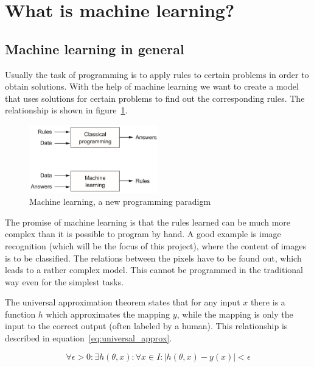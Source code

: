 \section{What is machine learning?} \label{ch:what_is_ml}

\subsection{Machine learning in general}

Usually the task of programming is to apply rules to certain problems in order to obtain solutions.
With the help of machine learning we want to create a model that uses solutions for certain problems to find out the corresponding rules.
The relationship is shown in figure~\ref{fig:cp_vs_ml}.

\begin{figure}
    \centering
    \includegraphics[width=0.5\textwidth]{images/classical_prog_vs_ml.png}
    \caption[ML, a new programming paradigm]{Machine learning, a new programming paradigm \cite[p.5]{Chollet2017}}
    \label{fig:cp_vs_ml}
\end{figure}

The promise of machine learning is that the rules learned can be much more complex than it is possible to program by hand.
A good example is image recognition (which will be the focus of this project), where the content of images is to be classified.
The relations between the pixels have to be found out, which leads to a rather complex model.
This cannot be programmed in the traditional way even for the simplest tasks.

The universal approximation theorem \cite{Cybenko1989, Hornik1989} states that for any input $x$ there is a function $h$ which approximates the mapping $y$, while the mapping is only the input to the correct output (often labeled by a human).
This relationship is described in equation~\eqref{eq:universal_approx}.

\begin{equation}
    \forall \epsilon > 0 :
    \exists h(\theta, x) : \forall x \in I : | h(\theta, x) - y(x) | < \epsilon
    \label{eq:universal_approx}
\end{equation}


